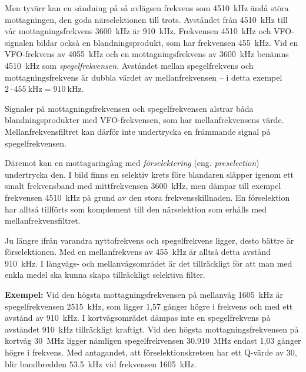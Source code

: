 Men tyvärr kan en sändning på så avlägsen frekvens som \SI{4510}{\kilo\hertz}
ändå störa mottagningen, den goda närselektionen till trots.
Avståndet från \SI{4510}{\kilo\hertz} till vår mottagningsfrekvens
\SI{3600}{\kilo\hertz} är \SI{910}{\kilo\hertz}.
Frekvensen \SI{4510}{\kilo\hertz} och VFO-signalen bildar också en
blandningsprodukt, som har frekvensen \SI{455}{\kilo\hertz}.
Vid en VFO-frekvens av \SI{4055}{\kilo\hertz} och en mottagningsfrekvens av
\SI{3600}{\kilo\hertz} benämns \SI{4510}{\kilo\hertz} som
\emph{spegelfrekvensen}.
Avståndet mellan spegelfrekvens och mottagningsfrekvens är dubbla värdet av
mellanfrekvensen -- i detta exempel \(2 \cdot \SI{455}{\kilo\hertz} =
\SI{910}{\kilo\hertz}\).

Signaler på mottagningsfrekvensen och spegelfrekvensen alstrar båda
blandningsprodukter med VFO-frekvensen, som har mellanfrekvensens värde.
Mellanfrekvensfiltret kan därför inte undertrycka en främmande signal på
spegelfrekvensen.


Däremot kan en mottagaringång med \emph{förselektering} (eng.
\emph{preselection}) undertrycka den.
I bild  finns en selektiv krets före blandaren släpper
igenom ett smalt frekvensband med mittfrekvensen \SI{3600}{\kilo\hertz}, men
dämpar till exempel frekvensen \SI{4510}{\kilo\hertz} på grund av den stora
frekvensskillnaden.
En förselektion har alltså tillförts som komplement till den närselektion som
erhålls med mellanfrekvensfiltret.


Ju längre ifrån varandra nyttofrekvens och spegelfrekvens ligger, desto bättre
är förselektionen.
Med en mellanfrekvens av \SI{455}{\kilo\hertz} är alltså detta avstånd
\SI{910}{\kilo\hertz}.
I långvågs- och mellanvågsområdet är det tillräckligt för att man med enkla
medel ska kunna skapa tillräckligt selektiva filter.

\textbf{Exempel:}
Vid den högsta mottagningsfrekvensen på mellanvåg \SI{1605}{\kilo\hertz} är
spegelfrekvensen \SI{2515}{\kilo\hertz}, som ligger 1,57 gånger högre i frekvens
och med ett avstånd av \SI{910}{\kilo\hertz}.
I kortvågsområdet dämpas inte en spegelfrekvens på avståndet
\SI{910}{\kilo\hertz} tillräckligt kraftigt.
Vid den högsta mottagningsfrekvensen på kortvåg \SI{30}{\mega\hertz} ligger
nämligen spegelfrekvensen \SI{30,910}{\mega\hertz} endast 1,03 gånger högre i
frekvens.
Med antagandet, att förselektionskretsen har ett Q-värde av 30, blir
bandbredden \SI{53,5}{\kilo\hertz} vid frekvensen \SI{1605}{\kilo\hertz}.

